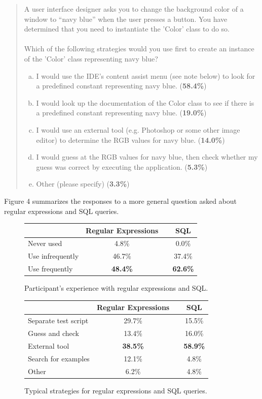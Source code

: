 \documentclass[conference]{IEEEtran}
\begin{document}
\begin{quote}
A user interface designer asks you to change the background color of a window to ``navy blue'' when the user presses a button. You have determined that you need to instantiate the 'Color' class to do so.
\\\\
Which of the following strategies would you use first to create an instance of the 'Color' class representing navy blue?\\

\begin{enumerate}[(a)]
\item I would use the IDE's content assist menu (see note below) to look for a predefined constant representing navy blue. (\textbf{58.4\%})
\item I would look up the documentation of the Color class to see if there is a predefined constant representing navy blue. (\textbf{19.0\%})
\item I would use an external tool (e.g. Photoshop or some other image editor) to determine the RGB values for navy blue. (\textbf{14.0\%})
\item I would guess at the RGB values for navy blue, then check whether my guess was correct by executing the application. (\textbf{5.3\%})
\item Other (please specify) (\textbf{3.3\%})\\
\end{enumerate}
\end{quote}

Figure 4 summarizes the responses to a more general question asked about regular expressions and SQL queries.

\begin{figure}
\begin{tabular}{lccc}
 & \textbf{Regular Expressions} &  & \textbf{SQL}\\
 \hline
Never used & 4.8\% &  & 0.0\%\\
Use infrequently & 46.7\% &  & 37.4\%\\
Use frequently & \textbf{48.4\%} &  & \textbf{62.6\%}\\
\hline
\end{tabular}
\caption{Participant's experience with regular expressions and SQL.}
\end{figure}

\begin{figure}
\begin{tabular}{lccc}
 & \textbf{Regular Expressions} &  & \textbf{SQL}\\
 \hline
Separate test script & 29.7\% &  & 15.5\%\\
Guess and check & 13.4\% &  & 16.0\%\\
External tool & \textbf{38.5\%} &  & \textbf{58.9\%}\\
Search for examples & 12.1\% & & 4.8\% \\
Other & 6.2\% & & 4.8\% \\
\hline
\end{tabular}
\caption{Typical strategies for regular expressions and SQL queries.}
\end{figure}
\end{document}
